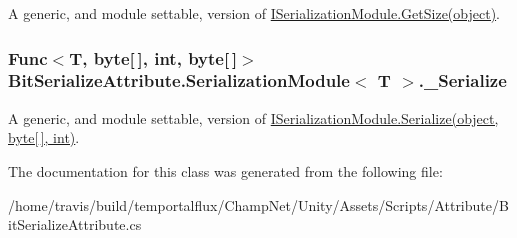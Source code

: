 A generic, and module settable, version of \hyperlink{interface_bit_serialize_attribute_1_1_i_serialization_module_a057ba8b3168eb8a0999a329cca222cea}{I\-Serialization\-Module.\-Get\-Size(object)}. 

\hypertarget{class_bit_serialize_attribute_1_1_serialization_module_3_01_t_01_4_a2e3a228e7b2cfe75c555a69c859f6564}{
\subsubsection[{\-\_\-\-Serialize}]{\setlength{\rightskip}{0pt plus 5cm}Func$<$T, byte\mbox{[}$\,$\mbox{]}, int, byte\mbox{[}$\,$\mbox{]}$>$ Bit\-Serialize\-Attribute.\-Serialization\-Module$<$ T $>$.\-\_\-\-Serialize}}\label{class_bit_serialize_attribute_1_1_serialization_module_3_01_t_01_4_a2e3a228e7b2cfe75c555a69c859f6564}


A generic, and module settable, version of \hyperlink{interface_bit_serialize_attribute_1_1_i_serialization_module_ad3b3d5f329538f550958a8342d9e0708}{I\-Serialization\-Module.\-Serialize(object, byte\mbox{[}$\,$\mbox{]}, int)}. 



The documentation for this class was generated from the following file\-:\begin{DoxyCompactItemize}
\item 
/home/travis/build/temportalflux/\-Champ\-Net/\-Unity/\-Assets/\-Scripts/\-Attribute/Bit\-Serialize\-Attribute.\-cs\end{DoxyCompactItemize}
